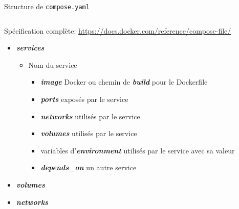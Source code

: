 \documentclass[aspectratio=169,10pt]{beamer}
\begin{document}
\begin{frame}{Structure de \texttt{compose.yaml}}

\begin{columns}[T,onlytextwidth]
    \begin{column}{.48\linewidth}
    Spécification complète: \url{https://docs.docker.com/reference/compose-file/}
    \begin{itemize}
        \item \emph{\textbf{services}} 
        \begin{itemize}
            \item Nom du service
            \begin{itemize}
                \item \emph{\textbf{image}} Docker ou chemin de \emph{\textbf{build}} pour le Dockerfile
                \item \emph{\textbf{ports}} exposés par le service
                \item \emph{\textbf{networks}} utilisés par le service
                \item \emph{\textbf{volumes}} utilisés par le service
                \item variables d'\emph{\textbf{environment}} utilisés par le service avec sa valeur
                \item \emph{\textbf{depends\_on}} un autre service
            \end{itemize}
        \end{itemize}
        \item \emph{\textbf{volumes}} 
        \item \emph{\textbf{networks}} 
    \end{itemize}
    \end{column}
    \begin{column}{.5\linewidth}
        \vspace{-0.4cm}
        \begin{center}

\end{center}
\end{column}
\end{columns}
\end{frame}
\end{document}

